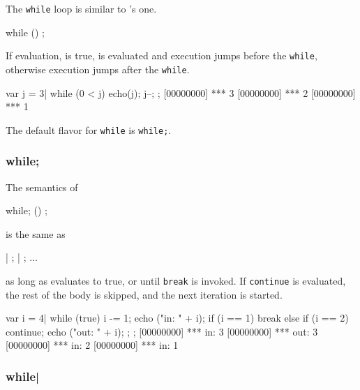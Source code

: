 The \lstinline|while| loop is similar to \C's one.

\begin{urbiunchecked}[frame=, backgroundcolor=, ]
while ()
  ;
\end{urbiunchecked}

If  evaluation, is true,  is evaluated and
execution jumps before the \lstinline|while|, otherwise execution
jumps after the \lstinline|while|.

\begin{urbiscript}[firstnumber=last]
var j = 3|
while (0 < j)
{
  echo(j);
  j--;
};
[00000000] *** 3
[00000000] *** 2
[00000000] *** 1
\end{urbiscript}

The default flavor for \lstinline|while| is \lstinline|while;|.

\subsubsection{while;}

The semantics of

\begin{urbiunchecked}[frame=, backgroundcolor=, ]
while; ()
  ;
\end{urbiunchecked}

\noindent
is the same as

\begin{urbiunchecked}[frame=, backgroundcolor=, ]
 |  ;  |  ; ...
\end{urbiunchecked}

\noindent
as long as  evaluates to true, or until \lstinline|break| is
invoked.  If \lstinline|continue| is evaluated, the rest of the body
is skipped, and the next iteration is started.

\begin{urbiscript}[firstnumber=last]
{
  var i = 4|
  while (true)
  {
    i -= 1;
    echo ("in: " + i);
    if (i == 1)
      break
    else if (i == 2)
      continue;
    echo ("out: " + i);
  };
};
[00000000] *** in: 3
[00000000] *** out: 3
[00000000] *** in: 2
[00000000] *** in: 1
\end{urbiscript}


\subsubsection{while|}


